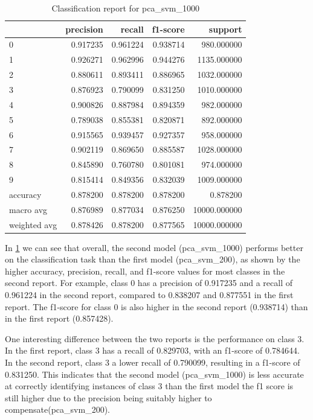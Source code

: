 \begin{table}[htb!]
    \centering
    \begin{tabular}{lrrrr}
        \toprule
        & precision & recall & f1-score & support \\
        \midrule
        0 & 0.917235 & 0.961224 & 0.938714 & 980.000000 \\
        1 & 0.926271 & 0.962996 & 0.944276 & 1135.000000 \\
        2 & 0.880611 & 0.893411 & 0.886965 & 1032.000000 \\
    3 & 0.876923 & 0.790099 & 0.831250 & 1010.000000 \\
    4 & 0.900826 & 0.887984 & 0.894359 & 982.000000 \\
    5 & 0.789038 & 0.855381 & 0.820871 & 892.000000 \\
    6 & 0.915565 & 0.939457 & 0.927357 & 958.000000 \\
    7 & 0.902119 & 0.869650 & 0.885587 & 1028.000000 \\
    8 & 0.845890 & 0.760780 & 0.801081 & 974.000000 \\
    9 & 0.815414 & 0.849356 & 0.832039 & 1009.000000 \\
    accuracy & 0.878200 & 0.878200 & 0.878200 & 0.878200 \\
    macro avg & 0.876989 & 0.877034 & 0.876250 & 10000.000000 \\
    weighted avg & 0.878426 & 0.878200 & 0.877565 & 10000.000000 \\
    \bottomrule
\end{tabular}
\caption{Classification report for pca\_svm\_1000}
\label{tab:classification-report-pca_svm_1000}
    \end{table}

In \ref{tab:classification-report-pca_svm_1000} we can see that overall, the second model (pca\_svm\_1000) performs better on the classification task than the first model (pca\_svm\_200), as shown by the higher accuracy, precision, recall, and f1-score values for most classes in the second report. For example, class 0 has a precision of 0.917235 and a recall of 0.961224 in the second report, compared to 0.838207 and 0.877551 in the first report. The f1-score for class 0 is also higher in the second report (0.938714) than in the first report (0.857428).

One interesting difference between the two reports is the performance on class 3. In the first report, class 3 has a recall of 0.829703, with an f1-score of 0.784644. In the second report, class 3 a lower recall of 0.790099, resulting in a f1-score of 0.831250. This indicates that the second model (pca\_svm\_1000) is less accurate at correctly identifying instances of class 3 than the first model the f1 score is still higher due to the precision being suitably higher to compensate(pca\_svm\_200).

